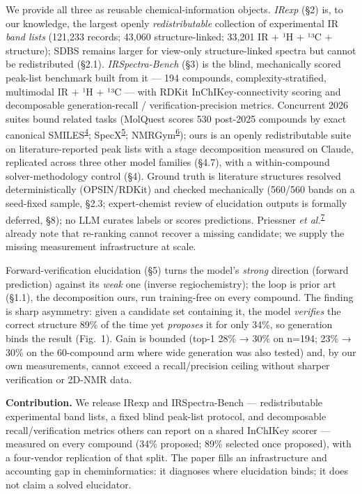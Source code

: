 \documentclass[
  10pt,
]{article}
\begin{document}
We provide all three as reusable chemical-information objects.
\emph{IRexp} (§2) is, to our knowledge, the largest openly
\emph{redistributable} collection of experimental IR \emph{band lists}
(121,233 records; 43,060 structure-linked; 33,201 IR + ¹H + ¹³C +
structure); SDBS remains larger for view-only structure-linked spectra
but cannot be redistributed (§2.1). \emph{IRSpectra-Bench} (§3) is the
blind, mechanically scored peak-list benchmark built from it --- 194
compounds, complexity-stratified, multimodal IR + ¹H + ¹³C --- with
RDKit InChIKey-connectivity scoring and decomposable generation-recall /
verification-precision metrics. Concurrent 2026 suites bound related
tasks (MolQuest scores 530 post-2025 compounds by exact canonical
SMILES\textsuperscript{\protect\hyperlink{ref-han2026molquest}{4}};
SpecX\textsuperscript{\protect\hyperlink{ref-xiang2026specx}{5}};
NMRGym\textsuperscript{\protect\hyperlink{ref-fang2026nmrgym}{6}}); ours
is an openly redistributable suite on literature-reported peak lists
with a stage decomposition measured on Claude, replicated across three
other model families (§4.7), with a within-compound solver-methodology
control (§4). Ground truth is literature structures resolved
deterministically (OPSIN/RDKit) and checked mechanically (560/560 bands
on a seed-fixed sample, §2.3; expert-chemist review of elucidation
outputs is formally deferred, §8); no LLM curates labels or scores
predictions. Priessner \emph{et
al.}\textsuperscript{\protect\hyperlink{ref-priessner2026reasoning}{7}}
already note that re-ranking cannot recover a missing candidate; we
supply the missing measurement infrastructure at scale.

Forward-verification elucidation (§5) turns the model's \emph{strong}
direction (forward prediction) against its \emph{weak} one (inverse
regiochemistry); the loop is prior art (§1.1), the decomposition ours,
run training-free on every compound. The finding is sharp asymmetry:
given a candidate set containing it, the model \emph{verifies} the
correct structure 89\% of the time yet \emph{proposes} it for only 34\%,
so generation binds the result (Fig.~1). Gain is bounded (top-1 28\% →
30\% on n=194; 23\% → 30\% on the 60-compound arm where wide generation
was also tested) and, by our own measurements, cannot exceed a
recall/precision ceiling without sharper verification or 2D-NMR data.

\textbf{Contribution.} We release IRexp and IRSpectra-Bench ---
redistributable experimental band lists, a fixed blind peak-list
protocol, and decomposable recall/verification metrics others can report
on a shared InChIKey scorer --- measured on every compound (34\%
proposed; 89\% selected once proposed), with a four-vendor replication
of that split. The paper fills an infrastructure and accounting gap in
cheminformatics: it diagnoses where elucidation binds; it does not claim
a solved elucidator.
\end{document}
